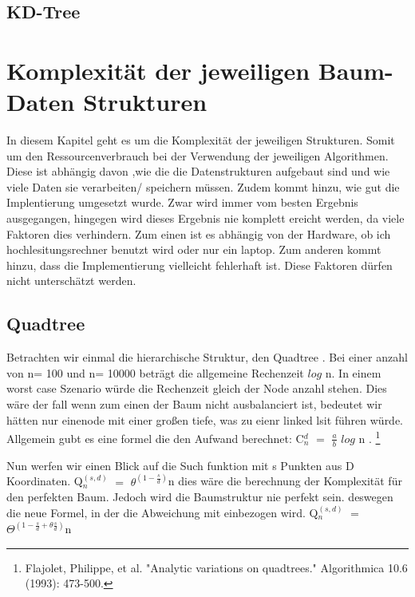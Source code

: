 \documentclass[11pt]{article}
\newcommand{\qt}{Quadtree }
\newcommand{\kd}{KD-Tree }
\begin{document}
\subsection{\kd}





\pagebreak

\section{Komplexität der jeweiligen Baum-Daten Strukturen}
In diesem Kapitel geht es um die Komplexität der jeweiligen Strukturen. Somit um den Ressourcenverbrauch bei der Verwendung der jeweiligen Algorithmen. Diese ist abhängig davon ,wie die die Datenstrukturen aufgebaut sind und wie viele Daten sie verarbeiten/ speichern müssen. 
Zudem kommt hinzu, wie gut die Implentierung umgesetzt wurde. Zwar wird immer vom besten Ergebnis ausgegangen, hingegen wird dieses Ergebnis nie komplett ereicht werden, da viele Faktoren dies verhindern. Zum einen ist es abhängig von der Hardware, ob ich hochlesitungsrechner benutzt wird oder nur ein laptop.
Zum anderen kommt hinzu, dass die Implementierung vielleicht fehlerhaft ist. Diese Faktoren dürfen nicht unterschätzt werden. 


\subsection{\qt}

Betrachten wir einmal die hierarchische Struktur, den \qt. Bei einer anzahl von n= 100 und n= 10000 beträgt die allgemeine Rechenzeit $log$ n. In einem worst case Szenario würde die Rechenzeit gleich der Node anzahl stehen. Dies wäre der fall wenn zum einen der Baum nicht ausbalanciert ist, bedeutet wir hätten nur einenode mit einer großen tiefe, was zu eienr linked lsit führen würde.
Allgemein gubt es eine formel die den Aufwand berechnet: C$_n^d$ $=$ $\frac{a}{b}$ $log$ n . \footnote[1]{Flajolet, Philippe, et al. "Analytic variations on quadtrees." Algorithmica 10.6 (1993): 473-500.}
\newline

Nun werfen wir einen Blick auf die Such funktion mit s Punkten aus D Koordinaten. 
Q$_n^{(s,d)}$ $=$ $\theta^{(1- \frac{s}{d})}$n  \newline
dies wäre die berechnung der Komplexität für den perfekten Baum. Jedoch wird die Baumstruktur nie perfekt sein. 
deswegen die neue Formel, in der die Abweichung mit einbezogen wird. 
Q$_n^{(s,d)}$ $=$ $\Theta^{(1- \frac{s}{d} + \theta\frac{s}{d})}$n 
\end{document}
